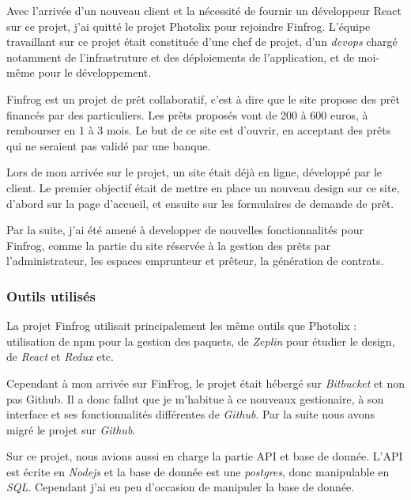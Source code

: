 \bigskip

Avec l'arrivée d'un nouveau client et la nécessité de fournir un
développeur React sur ce projet, j'ai quitté le projet Photolix pour
rejoindre Finfrog. L'équipe travaillant sur ce projet était constituée
d'une chef de projet, d'un \emph{devops} chargé notamment de
l'infrastruture et des déploiements de l'application, et de moi-même
pour le développement.

\bigskip

Finfrog est un projet de prêt collaboratif, c'est à dire que le site
propose des prêt financés par des particuliers. Les prêts proposés vont
de 200 à 600 euros, à rembourser en 1 à 3 mois. Le but de ce site est
d'ouvrir, en acceptant des prêts qui ne seraient pas validé par une
banque.

\bigskip

Lors de mon arrivée sur le projet, un site était déjà en ligne,
développé par le client. Le premier objectif était de mettre en place un
nouveau design sur ce site, d'abord sur la page d'accueil, et ensuite
sur les formulaires de demande de prêt.

\bigskip

Par la suite, j'ai été amené à developper de nouvelles fonctionnalités
pour Finfrog, comme la partie du site réservée à la gestion des prêts
par l'administrateur, les espaces emprunteur et prêteur, la génération
de contrats.

\subsubsection{Outils utilisés}\label{outils-utilisuxe9s-1}

\bigskip

La projet Finfrog utilisait principalement les même outils que Photolix
: utilisation de npm pour la gestion des paquets, de \emph{Zeplin} pour
étudier le design, de \emph{React} et \emph{Redux} etc.

\bigskip

Cependant à mon arrivée sur FinFrog, le projet était hébergé sur
\emph{Bitbucket} et non pas Github. Il a donc fallut que je m'habitue à
ce nouveaux gestionaire, à son interface et ses fonctionnalités
différentes de \emph{Github}. Par la suite nous avons migré le projet
sur \emph{Github}.

\bigskip

Sur ce projet, nous avions aussi en charge la partie API et base de
donnée. L'API est écrite en \emph{Nodejs} et la base de donnée est une
\emph{postgres}, donc manipulable en \emph{SQL}. Cependant j'ai eu peu
d'occasion de manipuler la base de donnée.

